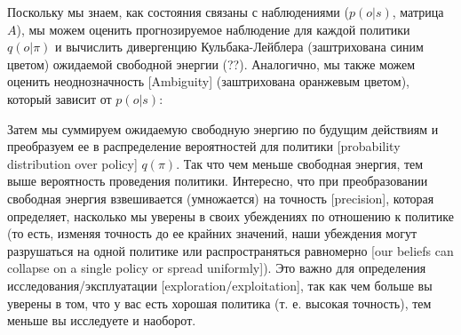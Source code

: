 \documentclass[twoside,leqno, 11pt]{article}
\begin{document}
	Поскольку мы знаем, как состояния связаны с наблюдениями ($p(o|s)$, матрица $A$), мы можем оценить прогнозируемое наблюдение для каждой политики $q(o|\pi)$ и вычислить дивергенцию Кульбака-Лейблера (заштрихована синим цветом) ожидаемой свободной энергии (??). Аналогично, мы также можем оценить неоднозначность [Ambiguity] (заштрихована оранжевым цветом), который зависит от $p(o|s)$:
	
	\newpage
	
	\begin{figure}[h]
	\end{figure}
	
	
	Затем мы суммируем ожидаемую свободную энергию по будущим действиям и преобразуем ее в распределение вероятностей для политики [probability distribution over policy] $q(\pi)$. Так что чем меньше свободная энергия, тем выше вероятность проведения политики. Интересно, что при преобразовании свободная энергия взвешивается (умножается) на точность [precision], которая определяет, насколько мы уверены в своих убеждениях по отношению к политике (то есть, изменяя точность до ее крайних значений, наши убеждения могут разрушаться на одной политике или распространяться равномерно [our beliefs can collapse on a single policy or spread uniformly]). Это важно для определения исследования/эксплуатации [exploration/exploitation], так как чем больше вы уверены в том, что у вас есть хорошая политика (т. е. высокая точность), тем меньше вы исследуете и наоборот.
	
\end{document}
